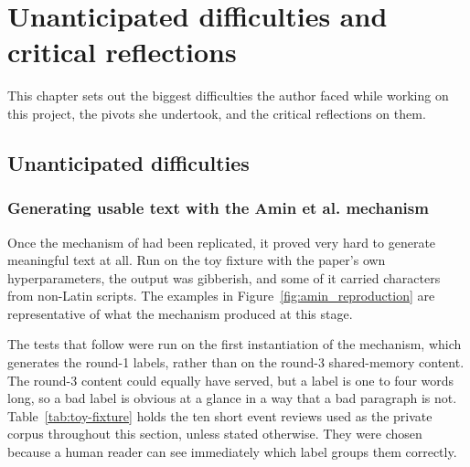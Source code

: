 \chapter{Unanticipated difficulties and critical reflections}\label{ch:difficulties}
This chapter sets out the biggest difficulties the author faced while working on this project, the pivots she undertook, and the critical reflections on them.

\section{Unanticipated difficulties}

\subsection{Generating usable text with the Amin et al. mechanism}\label{sec:difficulty-amin}

Once the mechanism of \citet{amin2024private} had been replicated, it proved very hard to generate meaningful text at all. Run on the toy fixture with the paper's own hyperparameters, the output was gibberish, and some of it carried characters from non-Latin scripts. The examples in Figure~\ref{fig:amin_reproduction} are representative of what the mechanism produced at this stage.

The tests that follow were run on the first instantiation of the mechanism, which generates the round-1 labels, rather than on the round-3 shared-memory content. The round-3 content could equally have served, but a label is one to four words long, so a bad label is obvious at a glance in a way that a bad paragraph is not. Table~\ref{tab:toy-fixture} holds the ten short event reviews used as the private corpus throughout this section, unless stated otherwise. They were chosen because a human reader can see immediately which label groups them correctly.

